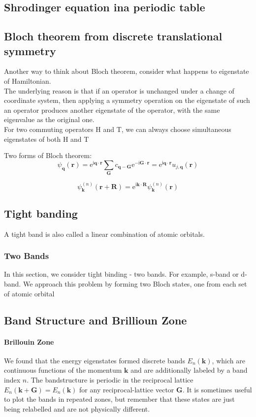 \documentclass[12pt,a4paper]{article}
\begin{document}
\subsection{Shrodinger equation ina periodic table}
\subsection{Bloch theorem from discrete translational symmetry}
Another way to think about Bloch theorem, consider what happens to eigenstate of Hamiltonian.\\ 

The underlying reason is that if an operator is unchanged under a change of coordinate system, then applying a symmetry operation on the eigenstate of such an operator produces another eigenstate of the operator, with the same eigenvalue as the original one.\\

For two commuting operators H and T, we can always choose simultaneous eigenstates of both H and T 

Two forms of Bloch theorem:
$$
\psi_{\boldsymbol{q}}(\boldsymbol{r})=\mathrm{e}^{\mathrm{i} \boldsymbol{q} \cdot \boldsymbol{r}} \sum_{\boldsymbol{G}} c_{\boldsymbol{q}-\boldsymbol{G}} \mathrm{e}^{-\mathrm{i} \boldsymbol{G} \cdot \boldsymbol{r}}=\mathrm{e}^{\mathrm{i} \boldsymbol{q} \cdot \boldsymbol{r}} u_{j, \boldsymbol{q}}(\boldsymbol{r})
$$            

$$
\psi_{\boldsymbol{k}}^{(n)}(\boldsymbol{r}+\boldsymbol{R})=\mathrm{e}^{\mathrm{i} \boldsymbol{k} \cdot \boldsymbol{R}} \psi_{\boldsymbol{k}}^{(n)}(\boldsymbol{r})
$$
\subsection{Tight banding}
A tight band is also called a linear combination of atomic orbitals.\\
\subsubsection{Two Bands}
In this section, we consider tight binding - two bands. For example, s-band or d-band.
We approach this problem by forming two Bloch states, one from each set of atomic orbital
      
\subsection{Band Structure and Brillioun Zone}
\paragraph*{Brillouin Zone}
We found that the energy eigenstates formed discrete bands $E_n(\boldsymbol{k})$, which are continuous functions of the momentum $\boldsymbol{k}$ and are additionally labeled by a band index $n$. The bandstructure is periodic in the reciprocal lattice $E_n(\boldsymbol{k}+\boldsymbol{G})=E_n(\boldsymbol{k})$ for any reciprocal-lattice vector $\boldsymbol{G}$. It is sometimes useful to plot the bands in repeated zones, but remember that these states are just being relabelled and are not physically different.
\end{document}
